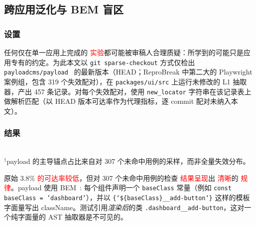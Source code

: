 \documentclass[UTF8, a4paper, 10.5pt, twocolumn, fontset=none]{ctexart}
\providecommand{\DIFaddbegin}{} %
\providecommand{\DIFaddend}{} %
\providecommand{\DIFaddtex}[1]{\textcolor{red}{#1}} %
\providecommand{\DIFadd}[1]{\texorpdfstring{\DIFaddtex{#1}}{#1}} %
\providecommand{\DIFaddincludegraphics}[2][]{{\color{blue}\fbox{\DIFOincludegraphics[#1]{#2}}}} %
\DeclareRobustCommand{\DIFaddbegin}{\DIFOaddbegin \let\includegraphics\DIFaddincludegraphics} %
\DeclareRobustCommand{\DIFaddend}{\DIFOaddend \let\includegraphics\DIFOincludegraphics} %
\begin{document}
\subsection{ 跨应用泛化与 BEM 盲区}
\label{sec:f3}

\subsubsection{设置}
任何仅在单一应用上完成的 \DIFaddbegin \DIFadd{实验}\DIFaddend 都可能被审稿人合理质疑：所学到的可能只是应用专有的约定。为此本文以 \texttt{git sparse-checkout} 方式仅检出 \texttt{payloadcms/payload}~\cite{payloadCMS} 的最新版本（HEAD；ReproBreak 中第二大的 Playwright 案例组，包含 319 个失效配对），在 \texttt{packages/ui/src} 上运行未修改的 L1 抽取器，产出 457 条记录。对每个失效配对，使用 \texttt{new\_locator} 字符串在该记录表上做解析匹配（以 HEAD 版本可达率作为代理指标，逐 commit 配对未纳入本文）。

\subsubsection{结果}
\begin{table}[t]
\centering
\caption{跨应用 L1 可达率（\S\ref{sec:f3}）。原始下降是真实的，但成因可诊断。}
\label{tab:cross-app}
\small
{}
\\[2pt]
{\scriptsize $^\dagger$payload 的主导锚点占比来自对 307 个未命中用例的采样，而非全量失效分布。}
\end{table}

原始 3.8\%  \DIFaddbegin \DIFadd{的可达率较低}\DIFaddend ，但对 307 个未命中用例的检查 \DIFaddbegin \DIFadd{结果呈现}\DIFaddend 出 \DIFaddbegin \DIFadd{清晰}\DIFaddend 的 \DIFaddbegin \DIFadd{规律}\DIFaddend 。payload 使用 BEM~\cite{bemMethodology}: 每个组件声明一个 \texttt{baseClass} 常量（例如 \texttt{const baseClass = 'dashboard'}），并以 \texttt{\{`\$\{baseClass\}\_\_add-button`\}} 这样的模板字面量写出 className。测试引用\emph{渲染后}的类 \texttt{.dashboard\_\_add-button}，这对一个纯字面量的 AST 抽取器是不可见的。
\end{document}
